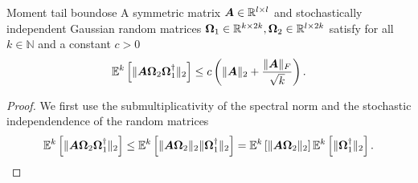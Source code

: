 \documentclass[12pt]{article}
\begin{document}
\begin{lemma}{Moment tail bound}{ose}
    A symmetric matrix $\boldsymbol{A} \in \mathbb{R}^{l \times l}$ and stochastically independent Gaussian random matrices $\boldsymbol{\Omega}_1 \in \mathbb{R}^{k \times 2k}, \boldsymbol{\Omega}_2 \in \mathbb{R}^{l \times 2k}$ satisfy for all $k \in \mathbb{N}$ and a constant $c > 0$
    \begin{equation}
        \mathbb{E}^{k}\left[ \lVert \boldsymbol{A} \boldsymbol{\Omega}_2 \boldsymbol{\Omega}_1^{\dagger} \rVert _2 \right] \leq c \left( \lVert \boldsymbol{A} \rVert _2 + \frac{\lVert \boldsymbol{A} \rVert _F}{\sqrt{k}} \right).
    \end{equation}
\end{lemma}

\begin{proof}
    We first use the submultiplicativity of the spectral norm and the stochastic independendence of the random matrices
    \begin{equation}
        \mathbb{E}^{k}\left[ \lVert \boldsymbol{A} \boldsymbol{\Omega}_2 \boldsymbol{\Omega}_1^{\dagger} \rVert _2 \right]
        \leq \mathbb{E}^{k}\left[ \lVert \boldsymbol{A} \boldsymbol{\Omega}_2 \rVert _2 \lVert \boldsymbol{\Omega}_1^{\dagger} \rVert _2 \right]
        = \mathbb{E}^{k}\left[ \lVert \boldsymbol{A} \boldsymbol{\Omega}_2 \rVert _2 \right] \mathbb{E}^{k}\left[  \lVert \boldsymbol{\Omega}_1^{\dagger} \rVert _2 \right].
        \label{equ:OSE-moment-bound-initial}
    \end{equation}


\end{proof}
\end{document}
